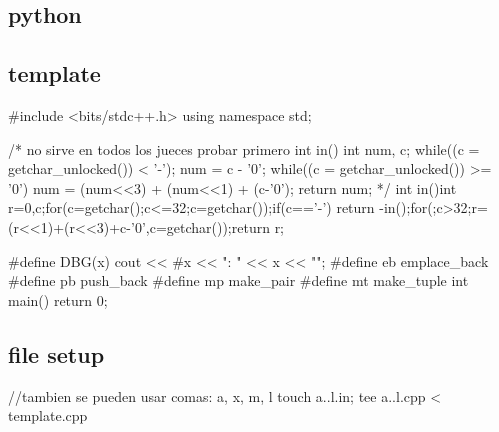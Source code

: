 \subsection{python}
\subsection{template}
\begin{code}
#include <bits/stdc++.h>
using namespace std;

/* no sirve en todos los jueces probar primero
int in() {
    int num, c;
    while((c = getchar_unlocked()) < '-');
    num = c - '0';
    while((c = getchar_unlocked()) >= '0') {
        num = (num<<3) + (num<<1) + (c-'0');
    }
    return num;
}
*/
int in(){int r=0,c;for(c=getchar();c<=32;c=getchar());if(c=='-') return -in();for(;c>32;r=(r<<1)+(r<<3)+c-'0',c=getchar());return r;}

#define DBG(x) cout << #x << ": " << x << "\n";
#define eb emplace_back
#define pb push_back
#define mp make_pair
#define mt make_tuple
int main(){
	return 0;
}
\end{code}
\subsection{file setup}
\begin{code}
//tambien se pueden usar comas: {a, x, m, l}
touch {a..l}.in; tee {a..l}.cpp < template.cpp
\end{code}

